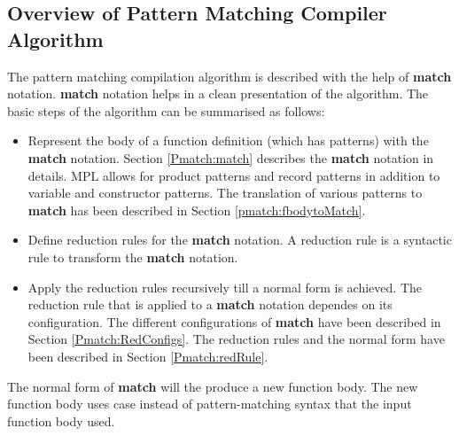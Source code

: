 \documentclass[11pt]{article}
\begin{document}
\subsection {Overview of Pattern Matching Compiler Algorithm}
The pattern matching compilation algorithm is described with the help of {\bf match} notation. {\bf match} notation helps in a clean presentation of the algorithm. The basic steps of the algorithm can be summarised as follows:
\begin{itemize}
  \item Represent the body of a function definition (which has patterns) with the {\bf match} notation. Section \ref{Pmatch:match} describes the {\bf match} notation in details. MPL allows for product patterns and record patterns in addition to variable and constructor patterns. The translation of various patterns to {\bf match} has been described in Section \ref {pmatch:fbodytoMatch}.
  \item Define reduction rules for the {\bf match} notation. A reduction rule is a syntactic rule to transform the {\bf match} notation.
  \item Apply the reduction rules recursively till a normal form is achieved. The reduction rule that is applied to a {\bf match} notation dependes on its configuration. The different configurations of {\bf match} have been described in Section \ref {Pmatch:RedConfigs}. The reduction rules and the normal form have been described in Section \ref {Pmatch:redRule}.
\end{itemize}
The normal form of {\bf match} will the produce a new function body. The new function body uses {\sf case} instead of pattern-matching syntax that the input function body used.
\end{document}
